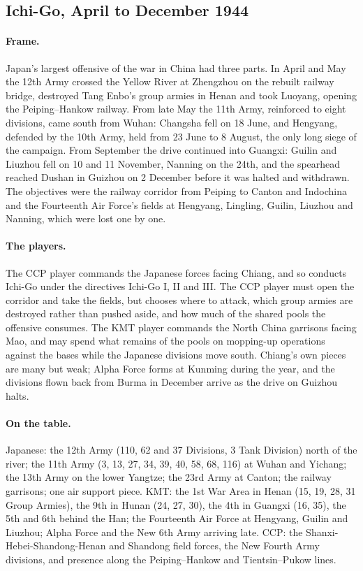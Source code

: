 \documentclass[11pt]{article}
\begin{document}
\clearpage
{}
\subsection{Ichi-Go, April to December 1944}\label{sub:sc-ichigo}
\paragraph{Frame.} Japan's largest offensive of the war in China had three parts. In April and May the 12th Army crossed the Yellow River at Zhengzhou on the rebuilt railway bridge, destroyed Tang Enbo's group armies in Henan and took Luoyang, opening the Peiping--Hankow railway. From late May the 11th Army, reinforced to eight divisions, came south from Wuhan: Changsha fell on 18 June, and Hengyang, defended by the 10th Army, held from 23 June to 8 August, the only long siege of the campaign. From September the drive continued into Guangxi: Guilin and Liuzhou fell on 10 and 11 November, Nanning on the 24th, and the spearhead reached Dushan in Guizhou on 2 December before it was halted and withdrawn. The objectives were the railway corridor from Peiping to Canton and Indochina and the Fourteenth Air Force's fields at Hengyang, Lingling, Guilin, Liuzhou and Nanning, which were lost one by one.
\paragraph{The players.} The CCP player commands the Japanese forces facing Chiang, and so conducts Ichi-Go under the directives Ichi-Go I, II and III. The CCP player must open the corridor and take the fields, but chooses where to attack, which group armies are destroyed rather than pushed aside, and how much of the shared pools the offensive consumes. The KMT player commands the North China garrisons facing Mao, and may spend what remains of the pools on mopping-up operations against the bases while the Japanese divisions move south. Chiang's own pieces are many but weak; Alpha Force forms at Kunming during the year, and the divisions flown back from Burma in December arrive as the drive on Guizhou halts.
\paragraph{On the table.} Japanese: the 12th Army (110, 62 and 37 Divisions, 3 Tank Division) north of the river; the 11th Army (3, 13, 27, 34, 39, 40, 58, 68, 116) at Wuhan and Yichang; the 13th Army on the lower Yangtze; the 23rd Army at Canton; the railway garrisons; one air support piece. KMT: the 1st War Area in Henan (15, 19, 28, 31 Group Armies), the 9th in Hunan (24, 27, 30), the 4th in Guangxi (16, 35), the 5th and 6th behind the Han; the Fourteenth Air Force at Hengyang, Guilin and Liuzhou; Alpha Force and the New 6th Army arriving late. CCP: the Shanxi-Hebei-Shandong-Henan and Shandong field forces, the New Fourth Army divisions, and presence along the Peiping--Hankow and Tientsin--Pukow lines.
\end{document}
